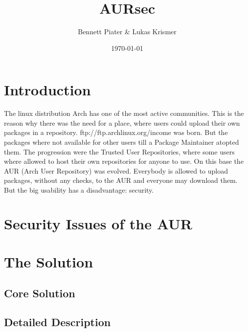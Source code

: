 \documentclass{scrartcl}
\title{AURsec}
\author{Bennett Piater \& Lukas Krismer}
\date{\today}
\begin{document}
  \thispagestyle{empty}

  


  \begin{abstract}
  \end{abstract}

  \tableofcontents
  \listoffigures
  \listoftables
  \pagebreak


  \section{Introduction}
  The linux distribution Arch has one of the most active communities. This is the reason why there was the need for a place, where users could upload their own packages in a repository.
  ftp://ftp.archlinux.org/income was born. But the packages where not available for other users till a Package Maintainer atopted them.
  The progression were the Trusted User Repositories, where some users where allowed to host their own repositories for anyone to use. On this base the AUR (Arch User Repository) was evolved.
  Everybody is allowed to upload packages, without any checks, to the AUR and everyone may download them. But the big usability has a disadvantage: security. \cite{wiki:AUR} %


  \section{Security Issues of the AUR}
  
  \section{The Solution}
    \subsection{Core Solution}
    \subsection{Detailed Description}
\end{document}
